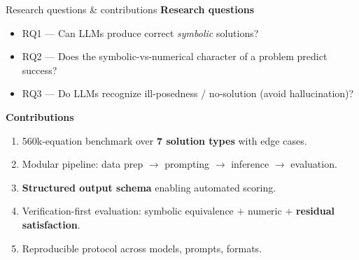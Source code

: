 \documentclass[10pt,aspectratio=169]{beamer}
\begin{document}
\begin{frame}{Research questions \& contributions}
  \textbf{Research questions}
  \begin{itemize}
    \item RQ1 --- Can LLMs produce correct \emph{symbolic} solutions?
    \item RQ2 --- Does the symbolic-vs-numerical character of a problem predict success?
    \item RQ3 --- Do LLMs recognize ill-posedness / no-solution (avoid hallucination)?
  \end{itemize}
  \vspace{4pt}
  \textbf{Contributions}
  \begin{enumerate}
    \item 560k-equation benchmark over \textbf{7 solution types} with edge cases.
    \item Modular pipeline: data prep $\to$ prompting $\to$ inference $\to$ evaluation.
    \item \textbf{Structured output schema} enabling automated scoring.
    \item Verification-first evaluation: symbolic equivalence $+$ numeric $+$ \textbf{residual satisfaction}.
    \item Reproducible protocol across models, prompts, formats.
  \end{enumerate}
\end{frame}
\end{document}
